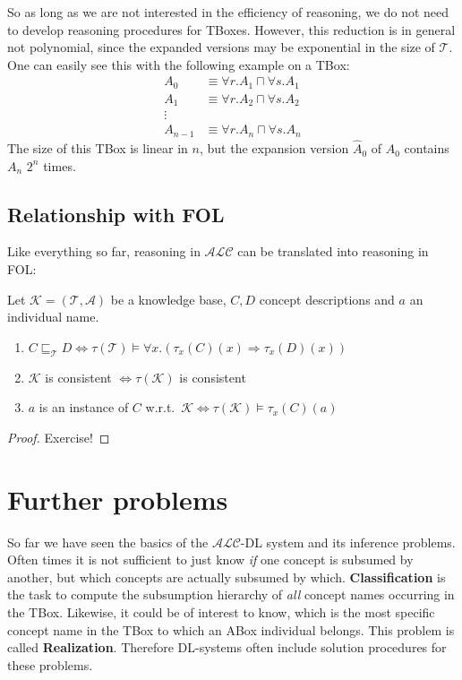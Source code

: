 So as long as we are not interested in the efficiency of reasoning, we do not need to develop reasoning procedures for TBoxes.
However, this reduction is in general not polynomial, since the expanded versions may be exponential in the size of $\mathcal{T}$.
One can easily see this with the following example on a TBox:
\begin{align*}
	A_0 &\equiv \forall r.A_1 \sqcap \forall s. A_1 \\
	A_1 &\equiv \forall r.A_2 \sqcap \forall s.A_2 \\
	\vdots & \\
	A_{n-1} & \equiv \forall r.A_n \sqcap \forall s.A_{n}
\end{align*}
The size of this TBox is linear in $n$,
but the expansion version $\widehat{A}_0$ of $A_0$ contains $A_n$ $2^n$ times.

\subsection{Relationship with FOL}
Like everything so far, reasoning in $\mathcal{ALC}$ can be translated into reasoning in FOL:
\begin{lemma}
	Let $\mathcal{K} = ( \mathcal{T},\mathcal{A})$ be a knowledge base, $C,D$ concept descriptions and $a$ an individual name.
	\begin{enumerate}
		\item $C \sqsubseteq_{\mathcal{T}} D \iff \tau(\mathcal{T}) \vDash \forall x.(\tau_x(C)(x) \Rightarrow \tau_x(D)(x))$
		\item $ \mathcal{K}$ is consistent $ \iff \tau(\mathcal{K})$ is consistent
		\item $a$ is an instance of $C$ w.r.t.\ $\mathcal{K} \iff \tau \left( \mathcal{K} \right) \vDash \tau_x(C)(a)$
	\end{enumerate}
\end{lemma}

\begin{proof}
	Exercise!	
\end{proof}

\section{Further problems}
So far we have seen the basics of the $\mathcal{ALC}$-DL system and its inference problems.
Often times it is not sufficient to just know \textit{if} one concept is subsumed by another,
but which concepts are actually subsumed by which.
\textbf{Classification} is the task to compute the subsumption hierarchy of \textit{all} concept names occurring in the TBox.
\newline
Likewise, it could be of interest to know, which is the most specific concept name in the TBox to which an ABox individual belongs.
This problem is called \textbf{Realization}.
\newline
Therefore DL-systems often include solution procedures for these problems.


